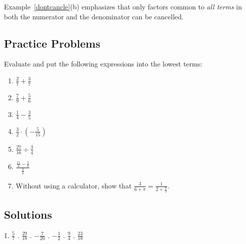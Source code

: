\documentclass[11pt]{book}               %
\begin{document}
Example~\ref{dontcancle}(b) emphasizes that only factors common to \emph{all terms} in both the numerator and the denominator can be cancelled.

\subsection{Practice Problems}

Evaluate and put the following expressions into the lowest terms:
\begin{enumerate}
\item $ \frac{2}{7} + \frac{3}{7} $ 
\item $ \frac{7}{9} + \frac{5}{6} $ 
\item $ \frac{1}{4} - \frac{3}{5} $ 
\item $ \frac{3}{2} \cdot \left(-\frac{5}{15}\right) $ 
\item $ \frac{27}{16} \div \frac{3}{4} $ 
\item $\displaystyle \frac{\frac{11}{4} - \frac{5}{6}}{\frac{3}{2}} $ 
\item Without using a calculator, show that $\frac{3}{6+\pi}=\frac{1}{2+\frac{\pi}{3}}$. %
\end{enumerate}


\subsection{Solutions}
1. $ \frac{5}{7} $ . $ \frac{29}{18} $ . $ -\frac{7}{20} $ . $ -\frac{1}{2} $ . $ \frac{9}{4} $ . $ \frac{23}{18} $

\newpage
\end{document}
